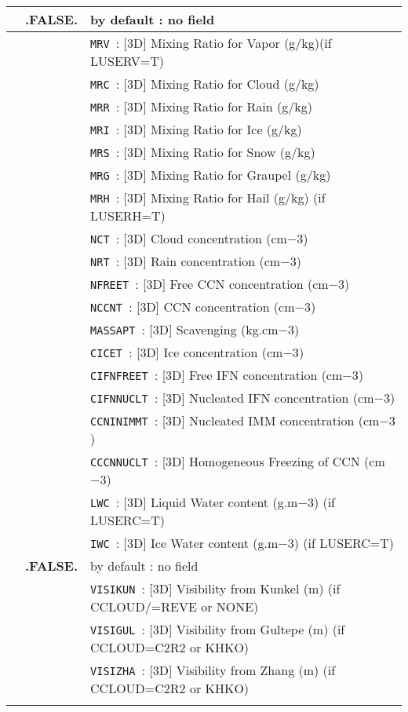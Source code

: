 \begin{center}
\begin{tabular}{|>{\centering}p{3cm}|>{\centering}p{2.5cm}|p{11cm}|}
\hline
\multirow{10}{*}{LLIMA\_DIAG}\index{LLIMA\_DIAG!\innam{NAM\_DIAG}}&\textbf{.FALSE.} & by default : no field\\\cline{2-3}
&\multirow{19}{*}{.TRUE.} &{\tt MRV }: [3D] Mixing Ratio for Vapor (g/kg)(if LUSERV=T)\\\cline{3-3}
& &{\tt MRC }: [3D] Mixing Ratio for Cloud (g/kg) \\\cline{3-3}
& &{\tt MRR }: [3D] Mixing Ratio for Rain (g/kg) \\\cline{3-3}
& &{\tt MRI }: [3D] Mixing Ratio for Ice (g/kg)\\\cline{3-3}
& &{\tt MRS }: [3D] Mixing Ratio for Snow (g/kg)\\\cline{3-3}
& &{\tt MRG }: [3D] Mixing Ratio for Graupel (g/kg) \\\cline{3-3}
& &{\tt MRH }: [3D] Mixing Ratio for Hail (g/kg) (if LUSERH=T)\\\cline{3-3}
& &{\tt NCT }: [3D] Cloud concentration (cm${-3}$)\\\cline{3-3}
& &{\tt NRT }: [3D] Rain concentration (cm${-3}$)\\\cline{3-3}
& &{\tt NFREET }: [3D] Free CCN concentration (cm${-3}$)\\\cline{3-3}
& &{\tt NCCNT }: [3D] CCN concentration (cm${-3}$)\\\cline{3-3}
& &{\tt MASSAPT }: [3D] Scavenging (kg.cm${-3}$)\\\cline{3-3}
& &{\tt CICET }: [3D] Ice concentration (cm${-3}$)\\\cline{3-3}
& &{\tt CIFNFREET }: [3D] Free IFN concentration (cm${-3}$)\\\cline{3-3}
& &{\tt CIFNNUCLT }: [3D] Nucleated IFN concentration (cm${-3}$)\\\cline{3-3}
& &{\tt CCNINIMMT }: [3D] Nucleated IMM concentration (cm${-3}$)\\\cline{3-3}
& &{\tt CCCNNUCLT }: [3D] Homogeneous Freezing of CCN (cm${-3}$)\\\cline{3-3}
& &{\tt LWC }: [3D] Liquid Water content (g.m${-3}$) (if LUSERC=T)\\\cline{3-3}
& &{\tt IWC }: [3D] Ice Water content (g.m${-3}$) (if LUSERC=T)\\\cline{3-3}
\hline
\multirow{10}{*}{LVISI}\index{LVISI!\innam{NAM\_DIAG}}&\textbf{.FALSE.} & by default : no field\\\cline{2-3}
&\multirow{6}{*}{.TRUE.} &{\tt VISIKUN }: [3D] Visibility from Kunkel (m) (if CCLOUD/=REVE or NONE) \\\cline{3-3}
& &{\tt VISIGUL }: [3D] Visibility from Gultepe (m) (if CCLOUD=C2R2 or KHKO)\\\cline{3-3}
& &{\tt VISIZHA }: [3D] Visibility from Zhang (m) (if CCLOUD=C2R2 or KHKO)\\\cline{3-3}
\hline
\end{tabular}
\end{center}

